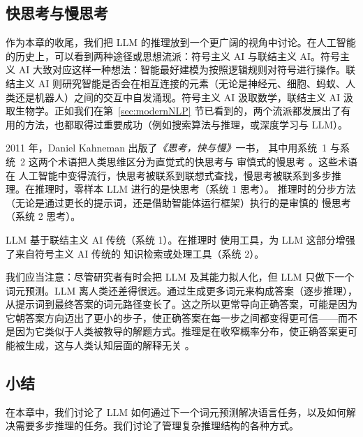 \subsection{快思考与慢思考}
\label{sec:fast-and-slow}
作为本章的收尾，我们把 LLM 的推理放到一个更广阔的视角中讨论。在人工智能的历史上，可以看到两种途径或思想流派：符号主义 AI 与联结主义 AI。符号主义 AI 大致对应这样一种想法：智能最好建模为按照逻辑规则对符号进行操作。联结主义 AI 则研究智能是否会在相互连接的元素（无论是神经元、细胞、蚂蚁、人类还是机器人）之间的交互中自发涌现。符号主义 AI 汲取数学，联结主义 AI 汲取生物学。正如我们在第~\ref{sec:modernNLP} 节已看到的，两个流派都发展出了有用的方法，也都取得过重要成功（例如搜索算法与推理，或深度学习与 LLM）。

2011 年，Daniel Kahneman 出版了{\em 《思考，快与慢》}一书，%
其中用系统~1 与系统~2
这两个术语把人类思维区分为直觉式的快思考与
审慎式的慢思考 \citep{kahneman2011thinking}。这些术语在
人工智能中变得流行，快思考被联系到联想式查找，慢思考被联系到多步推理。在推理时，零样本 LLM 进行的是快思考（系统 1 思考）。
推理时的分步方法（无论是通过更长的提示词，还是借助智能体运行框架）执行的是审慎的
慢思考
（系统 2 思考）。%

LLM 基于联结主义 AI 传统（系统 1）。在推理时
使用工具，为 LLM 这部分增强了来自符号主义 AI 传统的
知识检索或处理工具（系统 2）。

我们应当注意：尽管研究者有时会把 LLM 及其能力拟人化，但 LLM 只做下一个词元预测。LLM 离人类还差得很远。通过生成更多词元来构成答案（逐步推理），从提示词到最终答案的词元路径变长了。这之所以更常导向正确答案，可能是因为它朝答案方向迈出了更小的步子，使正确答案在每一步之间都变得更可信——而不是因为它类似于人类被教导的解题方式。推理是在收窄概率分布，使正确答案更可能被生成，这与人类认知层面的解释无关 \citep{guo2025deepseek}。

\subsection{小结}
在本章中，我们讨论了 LLM 如何通过下一个词元预测解决语言任务，以及如何解决需要多步推理的任务。我们讨论了管理复杂推理结构的各种方式。

